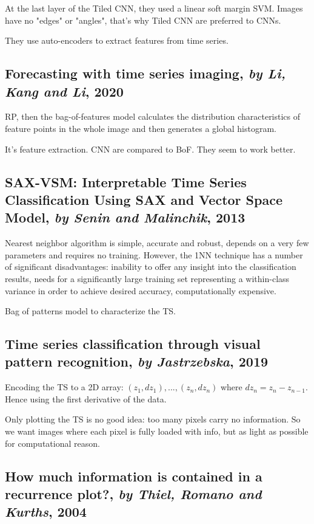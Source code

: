 \documentclass[11pt]{article}
\begin{document}
\begin{onehalfspace}
At the last layer of the Tiled CNN, they used a linear soft margin SVM. Images have no "edges" or "angles", that's why Tiled CNN are preferred to CNNs.

They use auto-encoders to extract features from time series.

\subsection{Forecasting with time series imaging, \textit{by Li, Kang and Li}, 2020}

RP, then the bag-of-features model calculates the distribution characteristics of feature points in the whole image and then generates a global histogram. 

It's feature extraction. CNN are compared to BoF. They seem to work better.

\subsection{SAX-VSM: Interpretable Time Series Classiﬁcation Using SAX and Vector Space Model, \textit{by Senin and Malinchik}, 2013}

Nearest neighbor algorithm is simple, accurate and robust, depends on a very few parameters and requires no training. However, the 1NN technique has a number of signiﬁcant disadvantages: inability to offer any insight into the classiﬁcation results, needs for a signiﬁcantly large training set representing a within-class variance in order to achieve desired accuracy, computationally expensive. 

Bag of patterns model to characterize the TS.

\subsection{Time series classification through visual pattern recognition, \textit{by Jastrzebska}, 2019}

Encoding the TS to a 2D array: $(z_1, dz_1), ..., (z_n, dz_n)$ where $dz_n = z_n - z_{n-1}$. Hence using the first derivative of the data.

Only plotting the TS is no good idea: too many pixels carry no information. So we want images where each pixel is fully loaded with info, but as light as possible for computational reason.

\subsection{How much information is contained in a recurrence plot?, \textit{by Thiel, Romano and Kurths}, 2004}


\end{onehalfspace}
\end{document}
